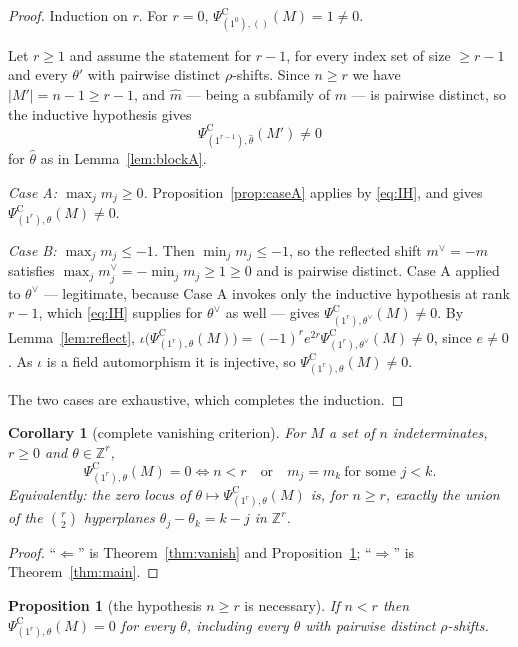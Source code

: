 \documentclass[11pt]{article}
\newtheorem{proposition}[theorem]{Proposition}
\newtheorem{corollary}[theorem]{Corollary}
\theoremstyle{definition}
\newcommand{\PsiC}{\Psi^{\mathrm{C}}}
\begin{document}
\begin{proof}
Induction on $r$. For $r=0$, $\PsiC_{(1^0),()}(M)=1\ne0$.

Let $r\ge1$ and assume the statement for $r-1$, for every index set of size $\ge r-1$ and
every $\theta'$ with pairwise distinct $\rho$-shifts. Since $n\ge r$ we have
$|M'|=n-1\ge r-1$, and $\hat m$ --- being a subfamily of $m$ --- is pairwise distinct, so
the inductive hypothesis gives
\begin{equation}\label{eq:IH}
  \PsiC_{(1^{r-1}),\hat\theta}(M')\ne0
\end{equation}
for $\hat\theta$ as in Lemma~\ref{lem:blockA}.

\emph{Case A: $\max_jm_j\ge0$.} Proposition~\ref{prop:caseA} applies by \eqref{eq:IH}, and
gives $\PsiC_{(1^r),\theta}(M)\ne0$.

\emph{Case B: $\max_jm_j\le-1$.} Then $\min_jm_j\le-1$, so the reflected shift
$m^\vee=-m$ satisfies $\max_jm^\vee_j=-\min_jm_j\ge1\ge0$ and is pairwise distinct. Case A
applied to $\theta^\vee$ --- legitimate, because Case A invokes only the inductive
hypothesis at rank $r-1$, which \eqref{eq:IH} supplies for $\theta^\vee$ as well --- gives
$\PsiC_{(1^r),\theta^\vee}(M)\ne0$. By Lemma~\ref{lem:reflect},
$\iota\bigl(\PsiC_{(1^r),\theta}(M)\bigr)=(-1)^re^{2r}\PsiC_{(1^r),\theta^\vee}(M)\ne0$,
since $e\ne0$. As $\iota$ is a field automorphism it is injective, so
$\PsiC_{(1^r),\theta}(M)\ne0$.

The two cases are exhaustive, which completes the induction.
\end{proof}

\begin{corollary}[complete vanishing criterion]\label{cor:criterion}
For $M$ a set of $n$ indeterminates, $r\ge0$ and $\theta\in\mathbb{Z}^r$,
\[
  \PsiC_{(1^r),\theta}(M)=0
  \iff
  n<r\quad\text{or}\quad m_j=m_k\ \text{for some }j<k .
\]
Equivalently: the zero locus of $\theta\mapsto\PsiC_{(1^r),\theta}(M)$ is, for $n\ge r$,
exactly the union of the $\binom r2$ hyperplanes $\theta_j-\theta_k=k-j$ in $\mathbb{Z}^r$.
\end{corollary}

\begin{proof}
``$\Leftarrow$'' is Theorem~\ref{thm:vanish} and Proposition~\ref{prop:boundary};
``$\Rightarrow$'' is Theorem~\ref{thm:main}.
\end{proof}

\begin{proposition}[the hypothesis $n\ge r$ is necessary]\label{prop:boundary}
If $n<r$ then $\PsiC_{(1^r),\theta}(M)=0$ for every $\theta$, including every $\theta$ with
pairwise distinct $\rho$-shifts.
\end{proposition}
\end{document}
